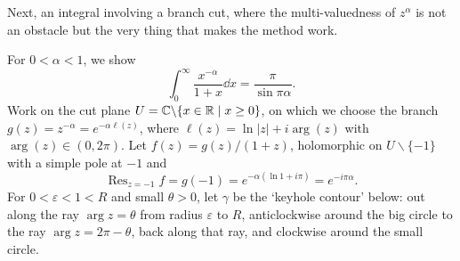 \documentclass[a4paper]{scrartcl}
\begin{document}
Next, an integral involving a branch cut, where the multi-valuedness of $z^{\alpha}$ is not an obstacle but the very thing that makes the method work.

\begin{example}
    For $0 < \alpha < 1$, we show
    $$
    \int_0^{\infty} \frac{x^{-\alpha}}{1 + x} \dd x = \frac{\pi}{\sin \pi \alpha}.
    $$
    Work on the cut plane $U = \mathbb{C} \backslash \{x \in \mathbb{R} \mid x \geq 0\}$, on which we choose the branch $g(z) = z^{-\alpha} = e^{-\alpha \ell(z)}$, where $\ell(z) = \ln|z| + i \arg(z)$ with $\arg(z) \in (0, 2\pi)$. Let $f(z) = g(z)/(1 + z)$, holomorphic on $U \backslash \{-1\}$ with a simple pole at $-1$ and
    $$
    \operatorname{Res}_{z = -1} f = g(-1) = e^{-\alpha(\ln 1 + i \pi)} = e^{-i \pi \alpha}.
    $$
    For $0 < \varepsilon < 1 < R$ and small $\theta > 0$, let $\gamma$ be the `keyhole contour' below: out along the ray $\arg z = \theta$ from radius $\varepsilon$ to $R$, anticlockwise around the big circle to the ray $\arg z = 2\pi - \theta$, back along that ray, and clockwise around the small circle.

    \begin{center}
    \end{center}


\end{example}
\end{document}
